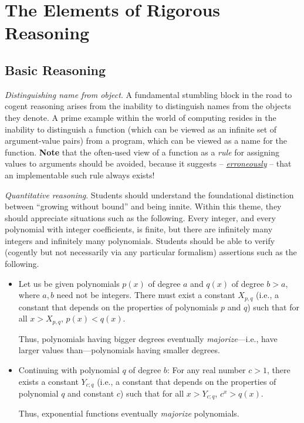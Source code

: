 \section{The Elements of Rigorous Reasoning}
\label{sec:elements-of-reasoning}

\subsection{Basic Reasoning}

{\em Distinguishing name from object}.
%
A fundamental stumbling block in the road to cogent reasoning arises
from the inability to distinguish names from the objects they denote.
A prime example within the world of computing resides in the inability
to distinguish a function (which can be viewed as an infinite set of
argument-value pairs) from a program, which can be viewed as a name
for the function.  {\bf Note} that the often-used view of a function
as a {\em rule} for assigning values to arguments should be avoided,
because it suggests -- \underline{\em erroneously} -- that an
implementable such rule always exists!

{\em Quantitative reasoning}.
%
Students should understand the foundational distinction between
``growing without bound'' and being innite.  Within this theme, they
should appreciate situations such as the following.  Every integer,
and every polynomial with integer coefficients, is finite, but there
are infinitely many integers and infinitely many polynomials.
Students should be able to verify (cogently but not necessarily via
any particular formalism) assertions such as the following.
\begin{itemize}
\item
Let us be given polynomials $p(x)$ of degree $a$ and $q(x)$ of degree
$b > a$, where $a, b$ need not be integers.  There must exist a
constant $X_{p,q}$ (i.e., a constant that depends on the properties of
polynomials $p$ and $q$) such that for all $x > X_{p,q}$, $p(x) <
q(x)$.

Thus, polynomials having bigger degrees eventually {\em
  majorize}---i.e., have larger values than---polynomials having
smaller degrees.

\item
Continuing with polynomial $q$ of degree $b$: For any real number $c >
1$, there exists a constant $Y_{c;q}$ (i.e., a constant that depends
on the properties of polynomial $q$ and constant $c$) such that for
all $x > Y_{c;q}$, $c^x > q(x)$.

Thus, exponential functions eventually {\em majorize} polynomials.
\end{itemize}

